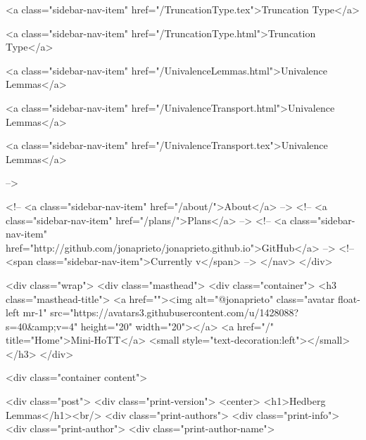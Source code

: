       
    
      
        
          <a class="sidebar-nav-item" href="/TruncationType.tex">Truncation Type</a>
        
      
    
      
        
          <a class="sidebar-nav-item" href="/TruncationType.html">Truncation Type</a>
        
      
    
      
        
          <a class="sidebar-nav-item" href="/UnivalenceLemmas.html">Univalence Lemmas</a>
        
      
    
      
        
          <a class="sidebar-nav-item" href="/UnivalenceTransport.html">Univalence Lemmas</a>
        
      
    
      
        
          <a class="sidebar-nav-item" href="/UnivalenceTransport.tex">Univalence Lemmas</a>
        
      
     -->

    <!-- <a class="sidebar-nav-item" href="/about/">About</a> -->
    <!-- <a class="sidebar-nav-item" href="/plans/">Plans</a> -->
    <!-- <a class="sidebar-nav-item" href="http://github.com/jonaprieto/jonaprieto.github.io">GitHub</a> -->
    <!-- <span class="sidebar-nav-item">Currently v</span> -->
  </nav>
</div>

    <div class="wrap">
      <div class="masthead">
        <div class="container">
          <h3 class="masthead-title">
            <a href=""><img alt="@jonaprieto" class="avatar float-left mr-1" src="https://avatars3.githubusercontent.com/u/1428088?s=40&amp;v=4" height="20" width="20"></a>
            <a href="/" title="Home">Mini-HoTT</a>
            <small style="text-decoration:left"></small>
          </h3>
        </div>
      
      <div class="container content">
        







<div class="post">
  <div class="print-version">
    <center>
      <h1>Hedberg Lemmas</h1><br/>
        <div class="print-authors">
          <div class="print-info">
            <div class="print-author">
              <div class="print-author-name">
                
